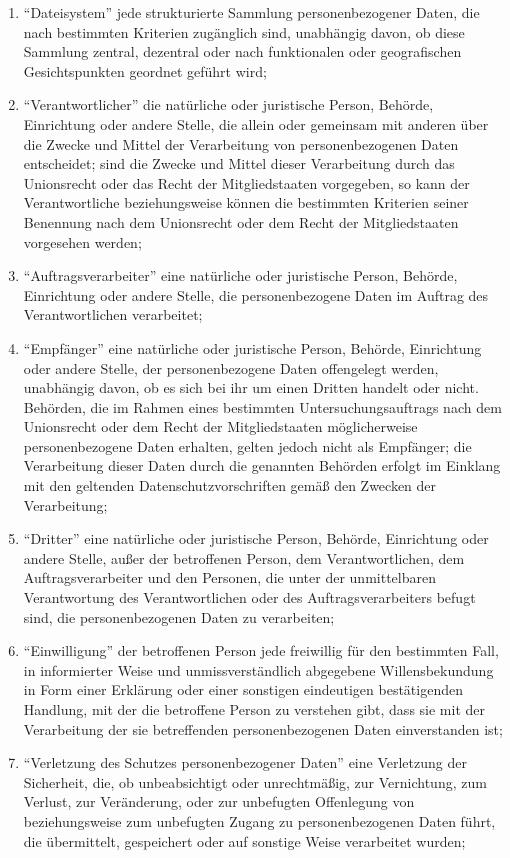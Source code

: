 \documentclass[A4, 12pt]{scrbook}
\begin{document}
\begin{enumerate}[label=\arabic*.]
            \item ``Dateisystem'' jede strukturierte Sammlung personenbezogener Daten, die nach bestimmten Kriterien zugänglich sind, unabhängig davon, ob diese Sammlung zentral, dezentral oder nach funktionalen oder geografischen Gesichtspunkten geordnet geführt wird;
            \item ``Verantwortlicher'' die natürliche oder juristische Person, Behörde, Einrichtung oder andere Stelle, die allein oder gemeinsam mit anderen über die Zwecke und Mittel der Verarbeitung von personenbezogenen Daten entscheidet; sind die Zwecke und Mittel dieser Verarbeitung durch das Unionsrecht oder das Recht der Mitgliedstaaten vorgegeben, so kann der Verantwortliche beziehungsweise können die bestimmten Kriterien seiner Benennung nach dem Unionsrecht oder dem Recht der Mitgliedstaaten vorgesehen werden;
            \item ``Auftragsverarbeiter'' eine natürliche oder juristische Person, Behörde, Einrichtung oder andere Stelle, die personenbezogene Daten im Auftrag des Verantwortlichen verarbeitet;
            \item ``Empfänger'' eine natürliche oder juristische Person, Behörde, Einrichtung oder andere Stelle, der personenbezogene Daten offengelegt werden, unabhängig davon, ob es sich bei ihr um einen Dritten handelt oder nicht. Behörden, die im Rahmen eines bestimmten Untersuchungsauftrags nach dem Unionsrecht oder dem Recht der Mitgliedstaaten möglicherweise personenbezogene Daten erhalten, gelten jedoch nicht als Empfänger; die Verarbeitung dieser Daten durch die genannten Behörden erfolgt im Einklang mit den geltenden Datenschutzvorschriften gemäß den Zwecken der Verarbeitung;
            \item  ``Dritter'' eine natürliche oder juristische Person, Behörde, Einrichtung oder andere Stelle, außer der betroffenen Person, dem Verantwortlichen, dem Auftragsverarbeiter und den Personen, die unter der unmittelbaren Verantwortung des Verantwortlichen oder des Auftragsverarbeiters befugt sind, die personenbezogenen Daten zu verarbeiten;
            \item ``Einwilligung'' der betroffenen Person jede freiwillig für den bestimmten Fall, in informierter Weise und unmissverständlich abgegebene Willensbekundung in Form einer Erklärung oder einer sonstigen eindeutigen bestätigenden Handlung, mit der die betroffene Person zu verstehen gibt, dass sie mit der Verarbeitung der sie betreffenden personenbezogenen Daten einverstanden ist;
            \item ``Verletzung des Schutzes personenbezogener Daten'' eine Verletzung der Sicherheit, die, ob unbeabsichtigt oder unrechtmäßig, zur Vernichtung, zum Verlust, zur Veränderung, oder zur unbefugten Offenlegung von beziehungsweise zum unbefugten Zugang zu personenbezogenen Daten führt, die übermittelt, gespeichert oder auf sonstige Weise verarbeitet wurden;

\end{enumerate}
\end{document}
